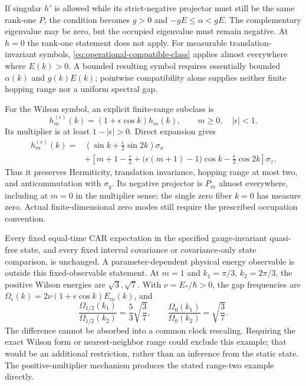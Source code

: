\documentclass[11pt]{article}
\theoremstyle{definition}
\begin{document}
If singular $h'$ is allowed while its strict-negative projector must still
be the same rank-one $P$, the condition becomes
$g>0$ and $-gE\le\alpha<gE$. The complementary eigenvalue may be zero,
but the occupied eigenvalue must remain negative. At $h=0$ the rank-one
statement does not apply. For measurable translation-invariant symbols,
\eqref{eq:operational-compatible-class} applies almost everywhere where
$E(k)>0$. A bounded resulting symbol requires essentially bounded
$\alpha(k)$ and $g(k)E(k)$; pointwise compatibility alone supplies neither
finite hopping range nor a uniform spectral gap.

For the Wilson symbol, an explicit finite-range subclass is
\begin{equation}
 h_m^{(\epsilon)}(k)=(1+\epsilon\cos k)h_m(k),
 \qquad m\ge0,\quad |\epsilon|<1.
 \label{eq:operational-finite-range-family}
\end{equation}
Its multiplier is at least $1-|\epsilon|>0$. Direct expansion gives
\begin{equation}
\begin{split}
 h_m^{(\epsilon)}(k)={}&
 \left(\sin k+\frac{\epsilon}{2}\sin 2k\right)\sigma_x\\
 &+\left[m+1-\frac{\epsilon}{2}
       +\bigl(\epsilon(m+1)-1\bigr)\cos k
       -\frac{\epsilon}{2}\cos 2k\right]\sigma_z .
\end{split}
\label{eq:operational-range-two-expansion}
\end{equation}
Thus it preserves Hermiticity, translation invariance, hopping range at
most two, and anticommutation with $\sigma_y$. Its negative projector is
$P_m$ almost everywhere, including at $m=0$ in the multiplier sense;
the single zero fiber $k=0$ has measure zero. Actual finite-dimensional
zero modes still require the prescribed occupation convention.

Every fixed equal-time CAR expectation in the specified gauge-invariant
quasi-free state, and every fixed interval covariance or covariance-only
state comparison, is unchanged. A parameter-dependent physical energy
observable is outside this fixed-observable statement. At $m=1$ and
$k_1=\pi/3$, $k_2=2\pi/3$, the positive Wilson energies are
$\sqrt3,\sqrt7$. With $\nu=E_*/\hbar>0$, the gap frequencies are
$\Omega_\epsilon(k)=2\nu(1+\epsilon\cos k)E_m(k)$, and
\begin{equation}
 \frac{\Omega_{1/2}(k_1)}{\Omega_{1/2}(k_2)}
 =\frac53\sqrt{\frac37},\qquad
 \frac{\Omega_0(k_1)}{\Omega_0(k_2)}=\sqrt{\frac37}.
 \label{eq:operational-gap-witness}
\end{equation}
The difference cannot be absorbed into a common clock rescaling.
Requiring the exact Wilson form or nearest-neighbor range could exclude
this example; that would be an additional restriction, rather than an
inference from the static state. The positive-multiplier mechanism produces the stated range-two example directly.
\end{document}
